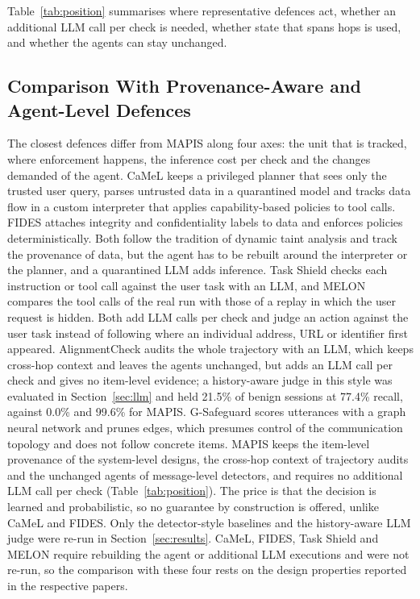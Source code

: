 \documentclass{ieeeaccess}
\begin{document}
Table~\ref{tab:position} summarises where representative defences act, whether an additional LLM call per check is needed, whether state that spans hops is used, and whether the agents can stay unchanged.

\subsection{Comparison With Provenance-Aware and Agent-Level Defences}
The closest defences differ from MAPIS along four axes: the unit that is tracked, where enforcement happens, the inference cost per check and the changes demanded of the agent. CaMeL \cite{debenedetti2025camel} keeps a privileged planner that sees only the trusted user query, parses untrusted data in a quarantined model and tracks data flow in a custom interpreter that applies capability-based policies to tool calls. FIDES \cite{costa2025fides} attaches integrity and confidentiality labels to data and enforces policies deterministically. Both follow the tradition of dynamic taint analysis \cite{newsome2005taint} and track the provenance of data, but the agent has to be rebuilt around the interpreter or the planner, and a quarantined LLM adds inference. Task Shield \cite{jia2025taskshield} checks each instruction or tool call against the user task with an LLM, and MELON \cite{zhu2025melon} compares the tool calls of the real run with those of a replay in which the user request is hidden. Both add LLM calls per check and judge an action against the user task instead of following where an individual address, URL or identifier first appeared. AlignmentCheck \cite{chennabasappa2025llamafirewall} audits the whole trajectory with an LLM, which keeps cross-hop context and leaves the agents unchanged, but adds an LLM call per check and gives no item-level evidence; a history-aware judge in this style was evaluated in Section~\ref{sec:llm} and held 21.5\% of benign sessions at 77.4\% recall, against 0.0\% and 99.6\% for MAPIS. G-Safeguard \cite{wang2025gsafeguard} scores utterances with a graph neural network and prunes edges, which presumes control of the communication topology and does not follow concrete items. MAPIS keeps the item-level provenance of the system-level designs, the cross-hop context of trajectory audits and the unchanged agents of message-level detectors, and requires no additional LLM call per check (Table~\ref{tab:position}). The price is that the decision is learned and probabilistic, so no guarantee by construction is offered, unlike CaMeL and FIDES. Only the detector-style baselines and the history-aware LLM judge were re-run in Section~\ref{sec:results}. CaMeL, FIDES, Task Shield and MELON require rebuilding the agent or additional LLM executions and were not re-run, so the comparison with these four rests on the design properties reported in the respective papers.
\end{document}
